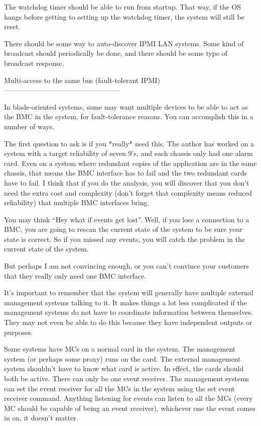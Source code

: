 The watchdog timer should be able to run from startup.  That way, if
the OS hangs before getting to setting up the watchdog timer, the
system will still be reset.

There should be some way to auto-discover IPMI LAN systems.  Some kind
of broadcast should periodically be done, and there should be some
type of broadcast response.


Multi-access to the same bus (fault-tolerant IPMI)
--------------------------------------------------

In blade-oriented systems, some may want multiple devices to be able
to act as the BMC in the system, for fault-tolerance reasons.  You can
accomplish this in a number of ways.

The first question to ask is if you *really* need this.  The author
has worked on a system with a target reliability of seven 9's, and
each chassis only had one alarm card.  Even on a system where
redundant copies of the application are in the same chassis, that
means the BMC interface has to fail and the two redundant cards have
to fail.  I think that if you do the analysis, you will discover that
you don't need the extra cost and complexity (don't forget that
complexity means reduced reliability) that multiple BMC interfaces
bring.

You may think ``Hey what if events get lost''.  Well, if you lose a
connection to a BMC, you are going to rescan the current state of the
system to be sure your state is correct.  So if you missed any events,
you will catch the problem in the current state of the system.

But perhaps I am not convincing enough, or you can't convince your
customers that they really only need one BMC interface.

It's important to remember that the system will generally have
multiple external management systems talking to it.  It makes things a
lot less complicated if the management systems do not have to
coordinate information between themselves.  They may not even be able
to do this because they have independent outputs or purposes.

Some systems have MCs on a normal card in the system.  The management
system (or perhaps some proxy) runs on the card.  The external
management system shouldn't have to know what card is active.  In
effect, the cards should both be active.  There can only be one event
receiver.  The management systems can set the event receiver for all
the MCs in the system using the set event receiver command.  Anything
listening for events can listen to all the MCs (every MC should be
capable of being an event receiver), whichever one the event comes in
on, it doesn't matter.

